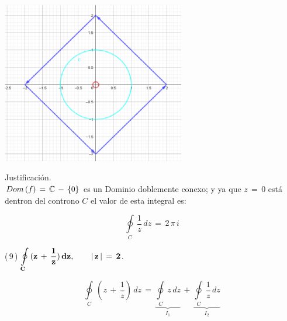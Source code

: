 \documentclass[a4paper,11pt,openany]{book}
\begin{document}
\begin{center}
     \includegraphics[width=8cm]{Gra-Ej-8.png}
\end{center}

\textcolor{ao(english)}{} Justificación.\\

$\mathnormal{Dom\,(f)}\,=\,\mathbb C\,-\,\{0\}$ es un Dominio doblemente conexo; y ya que $z\,=\,0$ está dentron del controno $C$ el valor de esta integral es:

$$\displaystyle\oint\limits_{C}\,\dfrac{1}{z}\,dz\,=\,2\,\pi\,i$$

\textcolor{ao(english)}{(\,9\,)} $\bf{\displaystyle\oint\limits_{C}\,(z\,+\,\dfrac{1}{z})\,dz}, \qquad |\,z\,|\,=\,2$.

$$\displaystyle\oint\limits_{C}\,(z\,+\,\dfrac{1}{z})\,dz\,=\,\underbrace{\displaystyle\oint\limits_{C}\,z\,dz}_{I_{1}}\,+\,\underbrace{\displaystyle\oint\limits_{C}\,\dfrac{1}{z}\,dz}_{I_{2}}$$
\end{document}
